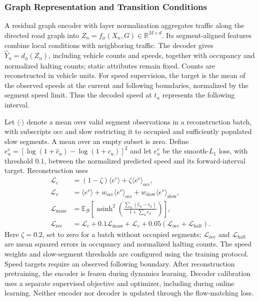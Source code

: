 \subsubsection{Graph Representation and Transition Conditions}

A residual graph encoder with layer normalization aggregates traffic
along the directed road graph into
$Z_n=f_\phi(X_n,G)\in\mathbb R^{M\times d}$.
Its segment-aligned features combine local conditions with neighboring
traffic. The decoder gives $\widehat Y_n=d_\phi(Z_n)$, including vehicle
counts and speeds, together with occupancy and normalized halting counts;
static attributes remain fixed. Counts are reconstructed in vehicle units.
For speed supervision, the target is the mean of the observed speeds at
the current and following boundaries, normalized by the segment speed
limit. Thus the decoded speed at $t_n$ represents the following interval.

Let $\langle\cdot\rangle$ denote a mean over valid segment observations in
a reconstruction batch, with subscripts $\mathrm{occ}$ and
$\mathrm{slow}$ restricting it to occupied and sufficiently populated
slow segments. A mean over an empty subset is zero. Define
$e_u^c=[\log(1+\widehat c_u)-\log(1+c_u)]^2$ and let $e_u^v$ be the
smooth-$L_1$ loss, with threshold $0.1$, between the normalized predicted
speed and its forward-interval target. Reconstruction uses
\begin{equation}
 \begin{aligned}
 \mathcal L_c
   &=(1-\zeta)\langle e^c\rangle
      +\zeta\langle e^c\rangle_{\mathrm{occ}},\\
 \mathcal L_v
   &=\langle e^v\rangle
      +w_{\mathrm{occ}}\langle e^v\rangle_{\mathrm{occ}}
      +w_{\mathrm{slow}}\langle e^v\rangle_{\mathrm{slow}},\\
 \mathcal L_{\mathrm{mass}}
   &=\mathbb E_{\mathcal B}\!\left[
      \operatorname{asinh}^{2}\!\left(
       \frac{\sum_u(\widehat c_u-c_u)}{1+\sum_u c_u}
      \right)\right],\\
 \mathcal L_{\mathrm{rec}}
   &=\mathcal L_c+0.1\mathcal L_{\mathrm{mass}}+\mathcal L_v
       +0.05(\mathcal L_{\mathrm{occ}}+\mathcal L_{\mathrm{halt}}).
 \end{aligned}
 \label{eq:traffic-reconstruction}
\end{equation}
Here $\zeta=0.2$, set to zero for a batch without occupied segments;
$\mathcal L_{\mathrm{occ}}$ and $\mathcal L_{\mathrm{halt}}$ are mean
squared errors in occupancy and normalized halting counts. The speed
weights and slow-segment thresholds are configured using the training
protocol. Speed targets require an observed following boundary.
After reconstruction pretraining, the encoder is frozen during dynamics
learning. Decoder calibration uses a separate supervised objective and
optimizer, including during online learning. Neither encoder nor decoder
is updated through the flow-matching loss.

